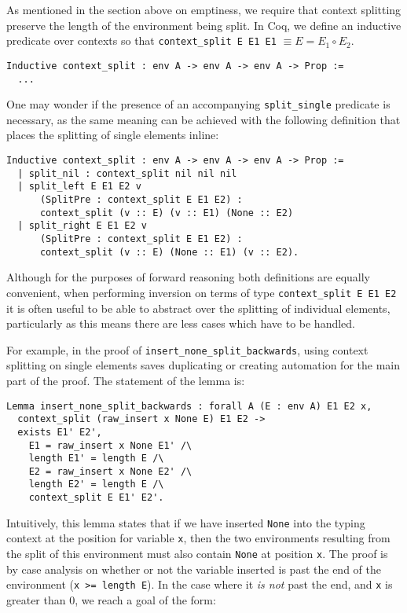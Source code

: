 \documentclass[]{unswthesis}
\let\c\texttt
\let\i\textit
\begin{document}
As mentioned in the section above on emptiness, we require that context splitting preserve the length of the environment being split. In Coq, we define an inductive predicate over contexts so that \c{context_split E E1 E1} $\equiv E = E_1 \circ E_2$.

\begin{verbatim}
Inductive context_split : env A -> env A -> env A -> Prop :=
  ...
\end{verbatim}

One may wonder if the presence of an accompanying \c{split_single} predicate is necessary, as the same meaning can be achieved with the following definition that places the splitting of single elements inline:

\begin{verbatim}
Inductive context_split : env A -> env A -> env A -> Prop :=
  | split_nil : context_split nil nil nil
  | split_left E E1 E2 v
  	  (SplitPre : context_split E E1 E2) :
  	  context_split (v :: E) (v :: E1) (None :: E2)
  | split_right E E1 E2 v
  	  (SplitPre : context_split E E1 E2) :
  	  context_split (v :: E) (None :: E1) (v :: E2).
\end{verbatim}

Although for the purposes of forward reasoning both definitions are equally convenient, when performing inversion on terms of type \c{context_split E E1 E2} it is often useful to be able to abstract over the splitting of individual elements, particularly as this means there are less cases which have to be handled.

For example, in the proof of \c{insert_none_split_backwards}, using context splitting on single elements saves duplicating or creating automation for the main part of the proof. The statement of the lemma is:

\begin{verbatim}
Lemma insert_none_split_backwards : forall A (E : env A) E1 E2 x,
  context_split (raw_insert x None E) E1 E2 ->
  exists E1' E2',
    E1 = raw_insert x None E1' /\
    length E1' = length E /\
    E2 = raw_insert x None E2' /\
    length E2' = length E /\
    context_split E E1' E2'.
\end{verbatim}

Intuitively, this lemma states that if we have inserted \c{None} into the typing context at the position for variable \c{x}, then the two environments resulting from the split of this environment must also contain \c{None} at position \c{x}. The proof is by case analysis on whether or not the variable inserted is past the end of the environment (\c{x >= length E}). In the case where it \i{is not} past the end, and \c{x} is greater than 0, we reach a goal of the form:
\end{document}
